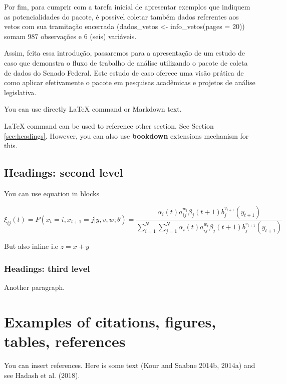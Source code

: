 \documentclass{article}
\begin{document}
Por fim, para cumprir com a tarefa inicial de apresentar exemplos que
indiquem as potencialidades do pacote, é possível coletar também dados
referentes aos vetos com sua tramitação encerrada (dados\_vetos
\textless- info\_vetos(pages = 20)) somam 987 observações e 6 (seis)
variáveis.

Assim, feita essa introdução, passaremos para a apresentação de um
estudo de caso que demonstra o fluxo de trabalho de análise utilizando o
pacote de coleta de dados do Senado Federal. Este estudo de caso oferece
uma visão prática de como aplicar efetivamente o pacote em pesquisas
acadêmicas e projetos de análise legislativa.

\label{sec:headings}

You can use directly LaTeX command or Markdown text.

LaTeX command can be used to reference other section. See Section
\ref{sec:headings}. However, you can also use \textbf{bookdown}
extensions mechanism for this.

\hypertarget{headings-second-level}{%
\subsection{Headings: second level}\label{headings-second-level}}

You can use equation in blocks

\[
\xi _{ij}(t)=P(x_{t}=i,x_{t+1}=j|y,v,w;\theta)= {\frac {\alpha _{i}(t)a^{w_t}_{ij}\beta _{j}(t+1)b^{v_{t+1}}_{j}(y_{t+1})}{\sum _{i=1}^{N} \sum _{j=1}^{N} \alpha _{i}(t)a^{w_t}_{ij}\beta _{j}(t+1)b^{v_{t+1}}_{j}(y_{t+1})}}
\]

But also inline i.e \(z=x+y\)

\hypertarget{headings-third-level}{%
\subsubsection{Headings: third level}\label{headings-third-level}}

Another paragraph.

\hypertarget{examples-of-citations-figures-tables-references}{%
\section{Examples of citations, figures, tables,
references}\label{examples-of-citations-figures-tables-references}}

\label{sec:others}

You can insert references. Here is some text (Kour and Saabne 2014b,
2014a) and see Hadash et al. (2018).
\end{document}
